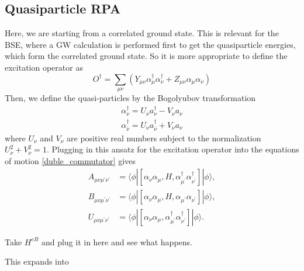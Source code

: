 \subsection{Quasiparticle RPA}
Here, we are starting from a correlated ground state. This is relevant for the BSE, where a GW calculation is performed first to get the quasiparticle energies, which form the correlated ground state. So it is more appropriate to define the excitation operator as
\begin{equation}
    O^{\dagger}=\sum_{\mu \nu}\left(Y_{\mu \nu} \alpha_\mu^{\dagger} \alpha_\nu^{\dagger}+Z_{\mu \nu} \alpha_\mu \alpha_\nu\right)
\end{equation}
Then, we define the quasi-particles by the Bogolyubov transformation
\begin{align}
    \alpha_\nu^{\dagger}=U_\nu a_\nu^{\dagger}-V_\nu a_\nu \\
    \alpha_{\bar{\nu}}^{\dagger}=U_\nu a_{\bar{\nu}}^{\dagger}+V_\nu a_\nu
\end{align}
where $U_\nu$ and $V_\nu$ are positive real numbers subject to the normalization $U_\nu^2+V_\nu^2=1$. Plugging in this ansatz for the excitation operator into the equations of motion \ref{duble_commutator} gives
\begin{align}
    A_{\mu \nu \mu^{\prime} \nu^{\prime}} &= \langle\phi|\left[\alpha_\nu \alpha_\mu, H, \alpha_{\mu^{\prime}}^{\dagger} \alpha_{\nu^{\prime}}^{\dagger}\right]|\phi\rangle, \\
    B_{\mu \nu \mu^{\prime} \nu^{\prime}} &= \langle\phi|\left[\alpha_\nu \alpha_\mu, H, \alpha_{\mu^{\prime}} \alpha_{\nu^{\prime}}\right]|\phi\rangle, \\
    U_{\mu \nu \mu^{\prime} \nu^{\prime}} &= \langle\phi|\left[\alpha_\nu \alpha_\mu, \alpha_{\mu^{\prime}}^{\dagger} \alpha_{\nu^{\prime}}^{\dagger}\right]|\phi\rangle .
\end{align}
\begin{tcolorbox}[colback=red!10!white, colframe=red!50!black, title=Idea]
Take $H^{eB}$ and plug it in here and see what happens.
\end{tcolorbox}
This expands into
